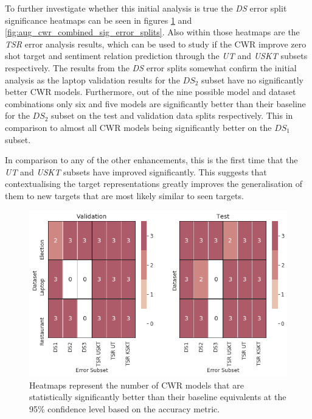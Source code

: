 To further investigate whether this initial analysis is true the \textit{DS} error split significance heatmaps can be seen in figures \ref{fig:aug_cwr_dataset_sig_error_splits} and \ref{fig:aug_cwr_combined_sig_error_splits}. Also within those heatmaps are the \textit{TSR} error analysis results, which can be used to study if the CWR improve zero shot target and sentiment relation prediction through the \textit{UT} and \textit{USKT} subsets respectively. The results from the \textit{DS} error splits somewhat confirm the initial analysis as the laptop validation results for the $DS_2$ subset have no significantly better CWR models. Furthermore, out of the nine possible model and dataset combinations only six and five models are significantly better than their baseline for the $DS_2$ subset on the test and validation data splits respectively. This in comparison to almost all CWR models being significantly better on the $DS_1$ subset. 

In comparison to any of the other enhancements, this is the first time that the \textit{UT} and \textit{USKT} subsets have improved significantly. This suggests that contextualising the target representations greatly improves the generalisation of them to new targets that are most likely similar to seen targets.

\begin{figure}[!h]
    \centering
    \includegraphics[scale=0.5]{images/augmentation/methods_performance/CWR/cwr_dataset_sig_error_splits.png}
    \caption{Heatmaps represent the number of CWR models that are statistically significantly better than their baseline equivalents at the 95\% confidence level based on the accuracy metric.}
    \label{fig:aug_cwr_dataset_sig_error_splits}
\end{figure}

